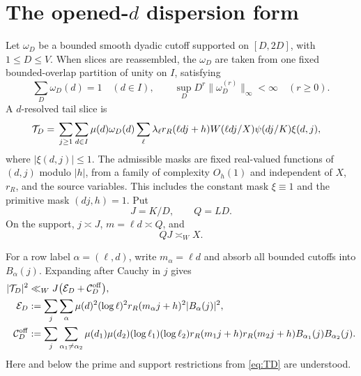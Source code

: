 \section{The opened-\texorpdfstring{$d$}{d} dispersion form}
\label{sec:opened-d}

Let $\omega_D$ be a bounded smooth dyadic cutoff supported on
$[D,2D]$, with $1\le D\le V$.  When slices are reassembled, the
$\omega_D$ are taken from one fixed bounded-overlap partition of unity
on $I$, satisfying
\begin{equation}
 \sum_D\omega_D(d)=1\quad(d\in I),
 \qquad
 \sup_DD^r\|\omega_D^{(r)}\|_\infty<\infty
 \quad(r\ge0).
 \label{eq:dyadic-d-partition}
\end{equation}
A $d$-resolved tail slice is
\begin{align}
 \mathcal T_D
 ={}&\sum_{j\ge1}\sum_{d\in I}
 \mu(d)\omega_D(d)
 \sum_\ell\lambda_\ell
 r_R(\ell dj+h)W(\ell dj/X)\psi(dj/K)\xi(d,j),
 \label{eq:TD}
\end{align}
where $|\xi(d,j)|\le1$.  The admissible masks are fixed real-valued
functions of $(d,j)$ modulo $|h|$, from a family of complexity $O_h(1)$ and
independent of $X$, $r_R$, and the source variables.  This includes the
constant mask $\xi\equiv1$ and the primitive mask $(dj,h)=1$.  Put
\begin{equation}
 J=K/D,\qquad Q=LD.
 \label{eq:JQ}
\end{equation}
On the support, $j\asymp J$, $m=\ell d\asymp Q$, and
\begin{equation}
 QJ\asymp_WX.
 \label{eq:QJ-X}
\end{equation}

For a row label $\alpha=(\ell,d)$, write $m_\alpha=\ell d$ and absorb
all bounded cutoffs into $B_\alpha(j)$.  Expanding after Cauchy in $j$
gives
\begin{align}
 |\mathcal T_D|^2
 &\ll_WJ\bigl(\mathcal E_D+\mathcal C_D^{\mathrm{off}}\bigr),
 \label{eq:d-first-TTstar}\\
 \mathcal E_D
 &:=\sum_j\sum_\alpha
 \mu(d)^2(\log\ell)^2r_R(m_\alpha j+h)^2|B_\alpha(j)|^2,
 \label{eq:d-diagonal}\\
 \mathcal C_D^{\mathrm{off}}
 &:=\sum_j\sum_{\substack{\alpha_1\ne\alpha_2}}
 \mu(d_1)\mu(d_2)(\log\ell_1)(\log\ell_2)
 r_R(m_1j+h)r_R(m_2j+h)
 B_{\alpha_1}(j)B_{\alpha_2}(j).
 \label{eq:d-off}
\end{align}
Here and below the prime and support restrictions from
\eqref{eq:TD} are understood.

